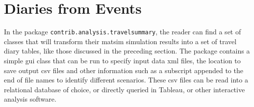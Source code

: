 \section{Diaries from Events}
In the package \lstinline|contrib.analysis.travelsummary|, the reader can find a set of classes that will transform their \gls{matsim} simulation results into a set of travel diary tables, like those discussed in the preceding section. The package contains a simple \gls{gui} class that can be run to specify input data \gls{xml} files, the location to save output \gls{csv} files and other information such as a subscript appended to the end of file names to identify different scenarios. These \gls{csv} files can be read into a relational database of choice, or directly queried in Tableau, or other interactive analysis software.





